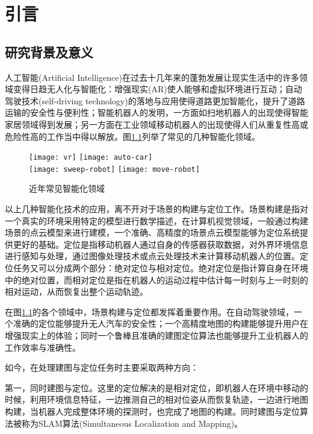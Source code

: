 
\chapter{引言}
\label{ch1}
\section{研究背景及意义}
人工智能(Artificial Intelligence)在过去十几年来的蓬勃发展让现实生活中的许多领域变得日趋无人化与智能化：增强现实(AR)使人能够和虚拟环境进行互动；自动驾驶技术(self-driving technology)的落地与应用使得道路更加智能化，提升了道路运输的安全性与便利性\cite{paden2016survey}；智能机器人的发明，一方面如扫地机器人的出现使得智能家居领域得到发展；另一方面在工业领域移动机器人的出现使得人们从重复性高或危险性高的工作当中得以解放\cite{cheng2005study}。图\ref{application}列举了常见的几种智能化领域。
\begin{figure}
	\centering
	{\texttt{[image: vr]}}
	{\texttt{[image: auto-car]}}\\
	{\texttt{[image: sweep-robot]}}
	{\texttt{[image: move-robot]}}
	\caption{近年常见智能化领域}
	\label{application}
\end{figure}

以上几种智能化技术的应用，离不开对于场景的构建与定位工作。场景构建是指对一个真实的环境采用特定的模型进行数学描述，在计算机视觉领域，一般通过构建场景的点云模型来进行建模，一个准确、高精度的场景点云模型能够为定位系统提供更好的基础。定位是指移动机器人通过自身的传感器获取数据，对外界环境信息进行感知与处理，通过图像处理技术或点云处理技术来计算移动机器人的位置。定位任务又可以分成两个部分：绝对定位与相对定位。绝对定位是指计算自身在环境中的绝对位置，而相对定位是指在机器人的运动过程中估计每一时刻与上一时刻的相对运动，从而恢复出整个运动轨迹。

在图\ref{application}的各个领域中，场景构建与定位都发挥着重要作用。在自动驾驶领域，一个准确的定位能够提升无人汽车的安全性；一个高精度地图的构建能够提升用户在增强现实上的体验；同时一个鲁棒且准确的建图定位算法也能够提升工业机器人的工作效率与准确性。

如今，在处理建图与定位任务时主要采取两种方向：

第一，同时建图与定位。这里的定位解决的是相对定位，即机器人在环境中移动的时候，利用环境信息特征，一边推测自己的相对位姿从而恢复轨迹，一边进行地图构建，当机器人完成整体环境的探测时，也完成了地图的构建。同时建图与定位算法被称为SLAM算法(Simultaneous Localization and Mapping)。

